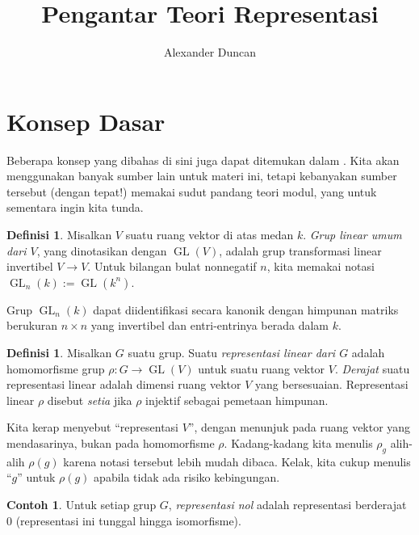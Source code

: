 \documentclass[12pt]{article}
\theoremstyle{plain}
\theoremstyle{definition}
\newtheorem{definition}[theorem]{Definisi}
\newtheorem{example}[theorem]{Contoh}
\theoremstyle{remark}
\numberwithin{equation}{section}
\begin{document}
\title{Pengantar Teori Representasi}
\author{Alexander Duncan}

\maketitle

\section{Konsep Dasar}

Beberapa konsep yang dibahas di sini juga dapat ditemukan dalam
\cite[\S{1}]{Serre}.
Kita akan menggunakan banyak sumber lain untuk materi ini,
tetapi kebanyakan sumber tersebut (dengan tepat!) memakai sudut pandang teori modul,
yang untuk sementara ingin kita tunda.

\begin{definition}
Misalkan $V$ suatu ruang vektor di atas medan $k$.
\emph{Grup linear umum dari $V$}, yang dinotasikan dengan $\operatorname{GL}(V)$, adalah grup
transformasi linear invertibel $V \to V$.
Untuk bilangan bulat nonnegatif $n$, kita memakai notasi
$\operatorname{GL}_n(k) := \operatorname{GL}(k^n)$.
\end{definition}

Grup $\operatorname{GL}_n(k)$ dapat diidentifikasi secara kanonik dengan himpunan matriks berukuran $n
\times n$ yang invertibel dan entri-entrinya berada dalam $k$.

\begin{definition}
Misalkan $G$ suatu grup. Suatu \emph{representasi linear dari $G$} adalah
homomorfisme grup $\rho : G \to \operatorname{GL}(V)$ untuk suatu ruang vektor $V$.
\emph{Derajat} suatu representasi linear adalah dimensi
ruang vektor $V$ yang bersesuaian.
Representasi linear $\rho$ disebut \emph{setia} jika $\rho$ injektif
sebagai pemetaan himpunan.
\end{definition}

Kita kerap menyebut “representasi $V$”, dengan menunjuk pada
ruang vektor yang mendasarinya, bukan pada homomorfisme $\rho$.
Kadang-kadang kita menulis $\rho_g$ alih-alih $\rho(g)$ karena notasi tersebut lebih mudah
dibaca. Kelak, kita cukup menulis “$g$” untuk $\rho(g)$ apabila
tidak ada risiko kebingungan.

\begin{example}
Untuk setiap grup $G$,
\emph{representasi nol} adalah representasi berderajat
$0$ (representasi ini tunggal hingga isomorfisme).
\end{example}
\end{document}
